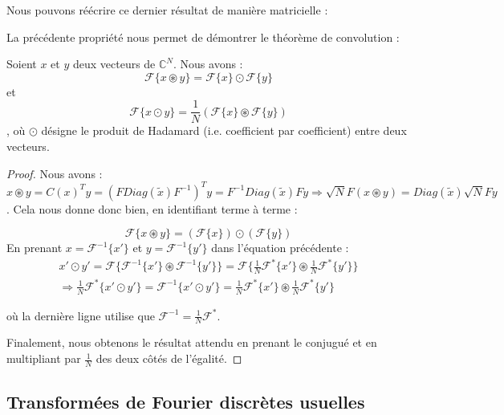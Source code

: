 \documentclass[11pt,oneside]{article}
\begin{document}
Nous pouvons réécrire ce dernier résultat de manière matricielle : 

    
    
La précédente propriété nous permet de démontrer le théorème de convolution :


\begin{tcolorbox}[colback=yellow!10!white,colframe=purple!75!black,title=Théorème: Théorème de convolution]
    Soient $x$ et $y$ deux vecteurs de $\mathbb{C}^N$. Nous avons :
    $$\mathcal{F}\{x \circledast y \} = \mathcal{F} \{x\} \odot \mathcal{F} \{y\} $$ et 
    $$\mathcal{F}\{x \odot y \} = \frac{1}{N} (\mathcal{F} \{x\} \circledast \mathcal{F} \{y\}) $$, où $\odot$ désigne le produit de Hadamard (i.e. coefficient par coefficient) entre deux vecteurs. 
\end{tcolorbox}


\begin{proof}
    Nous avons : 
    $$x\circledast y = C(x)^T y = (F Diag(\tilde x) F^{-1})^T y = F^{-1} Diag(\tilde x) F y \Rightarrow \sqrt{N} F (x \circledast y) = Diag(\tilde x) \sqrt{N} F y$$. Cela nous donne donc bien, en identifiant terme à terme :
    
    $$\mathcal{F}\{x \circledast y \} = (\mathcal{F} \{x\}) \odot (\mathcal{F} \{y\}) $$
    En prenant $x = \mathcal{F}^{-1}\{x'\}$ et $y = \mathcal{F}^{-1}\{y'\}$ dans l'équation précédente : 
    \begin{align*}x' \odot y' = \mathcal{F}\{\mathcal{F}^{-1}\{x'\} \circledast \mathcal{F}^{-1}\{y'\} \}  =  \mathcal{F}\{\frac{1}{N}\mathcal{F}^*\{x'\} \circledast \frac{1}{N} \mathcal{F}^*\{y'\} \}
    \\
    \Rightarrow \frac{1}{N} \mathcal{F}^* \{x' \odot y'\}  = \mathcal{F}^{-1} \{x' \odot y'\} = \frac{1}{N}\mathcal{F}^*\{x'\} \circledast \frac{1}{N} \mathcal{F}^*\{y'\}  \end{align*}

    où la dernière ligne utilise que $\mathcal{F}^{-1} = \frac{1}{N} \mathcal{F}^*$.

    Finalement, nous obtenons le résultat attendu en prenant le conjugué et en multipliant par  $\frac{1}{N}$ des deux côtés de l'égalité.
    
    
\end{proof}


\subsection{Transformées de Fourier discrètes usuelles}
\end{document}
